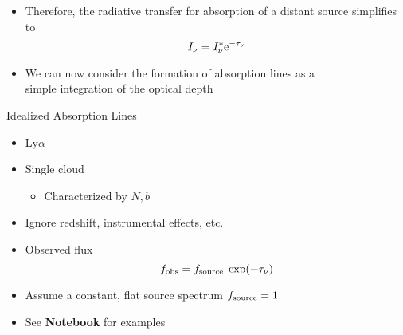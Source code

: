 \documentclass[12pt,letterpaper]{article}
\begin{document}
\begin{Aenumerate}
\begin{itemize}
  \item Therefore, the radiative transfer for absorption of a 
  distant source simplifies to
	\begin{equation}
	I_\nu = I_\nu^* {\rm e}^{-\tau_\nu}
	\end{equation}
  \item We can now consider the formation of absorption lines as a \\
 	simple integration of the optical depth
 \end{itemize}

 {\bf \item Idealized Absorption Lines}
 	\begin{itemize}
 	\item Ly$\alpha$
 	\item Single cloud 
 		\begin{itemize}
 		\item Characterized by $N, b$
 		\end{itemize}
 	\item Ignore redshift, instrumental effects, etc.
 	\item Observed flux
 	\begin{equation}
 	f_{\rm obs} = f_{\rm source} \; \exp(-\tau_\nu)
 	\end{equation}
 	\item Assume a constant, flat source spectrum $f_{\rm source} = 1$
 	\item See {\bf Notebook} for examples
 	\end{itemize}


\end{Aenumerate}
\end{document}
